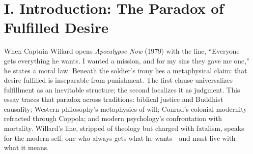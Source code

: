 \section*{I. Introduction: The Paradox of Fulfilled Desire}
When Captain Willard opens \textit{Apocalypse Now} (1979) with the line, ``Everyone gets everything he wants. I wanted a mission, and for my sins they gave me one,'' he states a moral law. Beneath the soldier’s irony lies a metaphysical claim: that desire fulfilled is inseparable from punishment. The first clause universalizes fulfillment as an inevitable structure; the second localizes it as judgment. This essay traces that paradox across traditions: biblical justice and Buddhist causality; Western philosophy’s metaphysics of will; Conrad’s colonial modernity refracted through Coppola; and modern psychology’s confrontation with mortality. Willard’s line, stripped of theology but charged with fatalism, speaks for the modern self: one who always gets what he wants—and must live with what it means.
